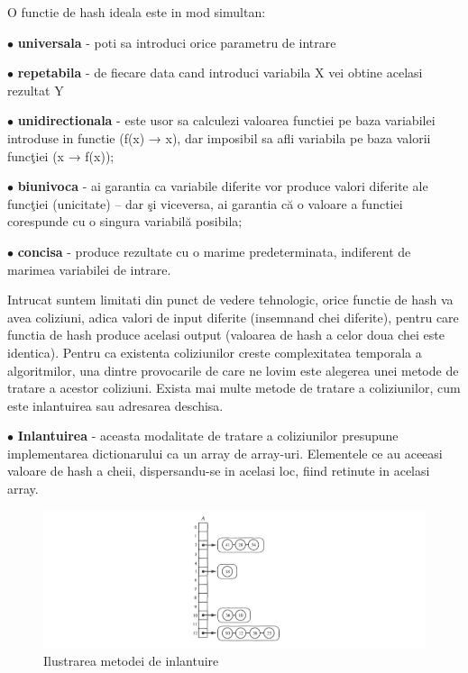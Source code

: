 \documentclass[runningheads]{llncs}
\begin{document}
\vspace{\baselineskip}
O functie de hash ideala este in mod simultan: 

$\bullet$ \textbf{universala} - poti sa introduci orice parametru de intrare

$\bullet$ \textbf{repetabila} - de fiecare data cand introduci variabila X vei obtine acelasi rezultat Y

$\bullet$ \textbf{unidirectionala} - este usor sa calculezi valoarea functiei pe baza variabilei introduse in functie (f(x) → x), dar imposibil sa afli variabila pe baza valorii funcţiei (x → f(x));

$\bullet$ \textbf{biunivoca} - ai garantia ca variabile diferite vor produce valori diferite ale funcţiei (unicitate) – dar şi viceversa, ai garantia că o valoare a functiei corespunde cu o singura variabilă posibila;

$\bullet$ \textbf{concisa} -  produce rezultate cu o marime predeterminata, indiferent de marimea variabilei de intrare.
\vspace{\baselineskip}

Intrucat suntem limitati din punct de vedere tehnologic, orice functie de hash va avea coliziuni, adica valori de input diferite (insemnand chei diferite), pentru care functia de hash produce acelasi output (valoarea de hash a celor doua chei este identica). Pentru ca existenta coliziunilor creste complexitatea temporala a algoritmilor, una dintre provocarile de care ne lovim este alegerea unei metode de tratare a acestor coliziuni. Exista mai multe metode de tratare a coliziunilor, cum este inlantuirea sau adresarea deschisa. 

\vspace{\baselineskip}
$\bullet$ \textbf{Inlantuirea} - aceasta modalitate de tratare a coliziunilor presupune implementarea dictionarului ca un array de array-uri. Elementele ce au aceeasi valoare de hash a cheii, dispersandu-se in acelasi loc, fiind retinute in acelasi array. 

\begin{figure}[ht!]
\includegraphics[width=120mm]{2.PNG}
\caption{Ilustrarea metodei de inlantuire \label{overflow}}
\end{figure}
\end{document}
